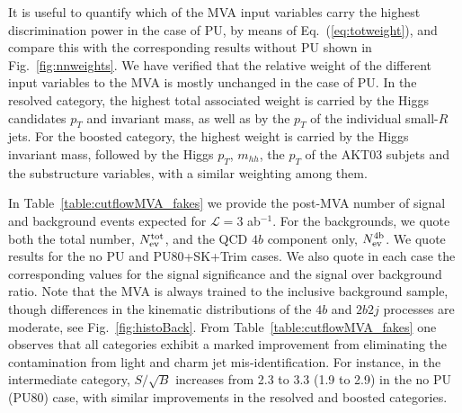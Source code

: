 It is useful to quantify which of the MVA input variables
carry the highest discrimination power
in the case of PU, by means of
Eq.~(\ref{eq:totweight}),
and compare this with the corresponding
results without PU shown in Fig.~\ref{fig:nnweights}.
%
We have verified that 
the relative weight of the different input variables to the MVA
is mostly unchanged in the case of PU.
%
In the resolved category, the highest total associated weight is carried
by the Higgs candidates $p_T$ and invariant mass, as well
as by the $p_T$ of the individual small-$R$ jets.
%
For the boosted category, the highest weight is carried by the
Higgs invariant mass, followed by
the Higgs $p_T$, $m_{hh}$, the $p_T$ of the AKT03 subjets and the
substructure variables, with a similar weighting among them.

In Table~\ref{table:cutflowMVA_fakes} we provide
the post-MVA number of signal and background events  expected for
$\mathcal{L}=3$ ab$^{-1}$.
%
For the backgrounds, we quote
both
the total number, $N_{\rm ev}^{\rm tot}$,
and the  QCD $4b$ component only,
$N_{\rm ev}^{\rm 4b}$.
%
We quote results for the no PU and PU80+SK+Trim cases.
%
 We also quote in each case the corresponding values for the signal 
    significance and the signal over background ratio.
    Note that the MVA is always trained to the inclusive background sample,
    though differences
    in the kinematic distributions of the $4b$ and $2b2j$ processes are
    moderate,
    see Fig.~\ref{fig:histoBack}.
    From Table~\ref{table:cutflowMVA_fakes} one observes that
    all categories exhibit
    a marked improvement from eliminating the contamination
    from light and charm jet mis-identification.
    For instance, in the intermediate category,
    $S/\sqrt{B}$ increases from 2.3 to 3.3 (1.9 to 2.9)
    in the no PU (PU80) case, with similar improvements in the
    resolved and boosted categories.

